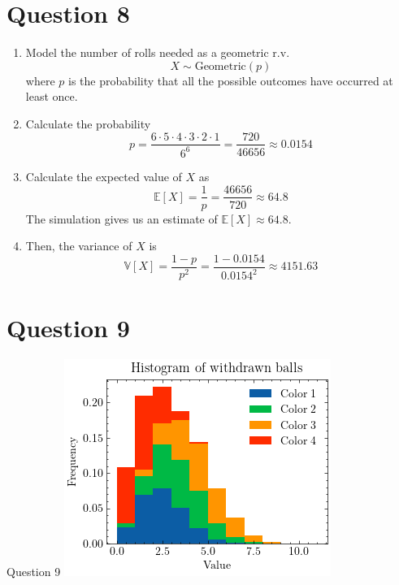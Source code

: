 \documentclass[compress,12pt]{beamer}
\begin{document}
\section{Question 8}

\begin{frame}
    \begin{enumerate}
        \item Model the number of rolls needed as a geometric r.v.
        \[
         X \sim \text{Geometric}(p)
         \]
         where $p$ is the probability that all the possible outcomes have occurred at least once. 
        \item Calculate the probability \[
        p = \frac{6 \cdot 5 \cdot 4 \cdot 3 \cdot 2 \cdot 1}{6^6} = \frac{720}{46656} \approx 0.0154
         \]
        \item Calculate the expected value of $X$ as
        \[
        \mathbb{E}[X] = \frac{1}{p} = \frac{46656}{720} \approx 64.8
        \]
         The simulation gives us an estimate of $\mathbb{E}[X] \approx 64.8$. 
        \item Then, the variance of $X$ is\[
        \mathbb{V}[X] = \frac{1 - p}{p^2} = \frac{1 - 0.0154}{0.0154^2} \approx 4151.63
         \]
    \end{enumerate}

\end{frame}

\section{Question 9}
\begin{frame}{Question 9}
\centering
\includegraphics[scale=0.3]{imgs/balls.png}  
\end{frame}
\end{document}
